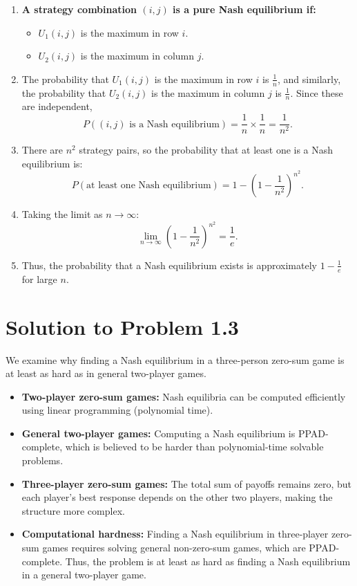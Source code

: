 \documentclass{article}
\begin{document}
\begin{enumerate}
    \item \textbf{A strategy combination $(i,j)$ is a pure Nash equilibrium if:}
    \begin{itemize}
        \item $U_1(i,j)$ is the maximum in row $i$.
        \item $U_2(i,j)$ is the maximum in column $j$.
    \end{itemize}
    \item The probability that $U_1(i,j)$ is the maximum in row $i$ is $\frac{1}{n}$, and similarly, the probability that $U_2(i,j)$ is the maximum in column $j$ is $\frac{1}{n}$. Since these are independent,
    \[
    P((i,j) \text{ is a Nash equilibrium}) = \frac{1}{n} \times \frac{1}{n} = \frac{1}{n^2}.
    \]
    \item There are $n^2$ strategy pairs, so the probability that at least one is a Nash equilibrium is:
    \[
    P(\text{at least one Nash equilibrium}) = 1 - \left(1 - \frac{1}{n^2}\right)^{n^2}.
    \]
    \item Taking the limit as $n \to \infty$:
    \[
    \lim_{n \to \infty} \left(1 - \frac{1}{n^2}\right)^{n^2} = \frac{1}{e}.
    \]
    \item Thus, the probability that a Nash equilibrium exists is approximately $1 - \frac{1}{e}$ for large $n$.
\end{enumerate}

\section*{Solution to Problem 1.3}

We examine why finding a Nash equilibrium in a three-person zero-sum game is at least as hard as in general two-player games.

\begin{itemize}
    \item \textbf{Two-player zero-sum games:} Nash equilibria can be computed efficiently using linear programming (polynomial time).
    \item \textbf{General two-player games:} Computing a Nash equilibrium is PPAD-complete, which is believed to be harder than polynomial-time solvable problems.
    \item \textbf{Three-player zero-sum games:} The total sum of payoffs remains zero, but each player's best response depends on the other two players, making the structure more complex.
    \item \textbf{Computational hardness:} Finding a Nash equilibrium in three-player zero-sum games requires solving general non-zero-sum games, which are PPAD-complete. Thus, the problem is at least as hard as finding a Nash equilibrium in a general two-player game.
\end{itemize}
\end{document}
